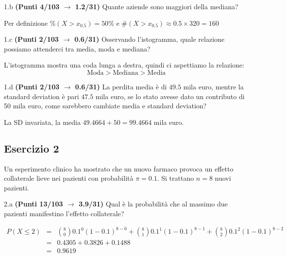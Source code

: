 \documentclass[
  11pt,
]{book}
\theoremstyle{mytheoremstyle}
\theoremstyle{mydefstyle}
\newenvironment{sol}
  {
  \begin{tcolorbox}[enhanced,breakable,arc=0.1mm,boxrule=1pt,colback=white,colframe=iblue,
  title=\bf \fontfamily{lmss}\selectfont \hspace{.5 cm} Soluzione,drop fuzzy shadow]

}{
\end{tcolorbox}
  }
\begin{document}
1.b \textbf{(Punti 4/103 \(\rightarrow\) 1.2/31)} Quante aziende sono maggiori della mediana?

\begin{sol}
Per definizione \(\%(X>x_{0.5})=50\%\) e
\(\#(X>x_{0.5})\approx0.5\times320 =160\)

\end{sol}

1.c \textbf{(Punti 2/103 \(\rightarrow\) 0.6/31)} Osservando l'istogramma, quale relazione possiamo attenderci tra media, moda e mediana?

\begin{sol}
L'istogramma mostra una coda lunga a destra, quindi ci aspettiamo la relazione:
\[
\text{Moda} > \text{Mediana} > \text{Media}
\]

\end{sol}

1.d \textbf{(Punti 2/103 \(\rightarrow\) 0.6/31)} La perdita media è di \(49.5\) mila euro, mentre la standard deviation è pari \(47.5\) mila euro, se lo stato avesse dato un contributo di 50 mila euro, come sarebbero cambiate media e standard deviation?

\begin{sol}
La SD invariata, la media \(49.4664+50=99.4664\) mila euro.

\end{sol}

\subsection{Esercizio 2}\label{esercizio-2-47}

Un esperimento clinico ha mostrato che un nuovo farmaco provoca un effetto collaterale lieve nei pazienti con probabilità \(\pi = 0.1\). Si trattano \(n = 8\) nuovi pazienti.

2.a \textbf{(Punti 13/103 \(\rightarrow\) 3.9/31)} Qual è la probabilità che al massimo due pazienti manifestino l'effetto collaterale?

\begin{sol}
\normalsize 
\begin{eqnarray*}
      P( X \leq 2 ) &=& \binom{ 8 }{ 0 } 0.1 ^{ 0 }(1- 0.1 )^{ 8 - 0 }+\binom{ 8 }{ 1 } 0.1 ^{ 1 }(1- 0.1 )^{ 8 - 1 }+\binom{ 8 }{ 2 } 0.1 ^{ 2 }(1- 0.1 )^{ 8 - 2 } \\                 &=& 0.4305+0.3826+0.1488 \\                 &=& 0.9619 
   \end{eqnarray*}
\normalsize 

\end{sol}
\end{document}
